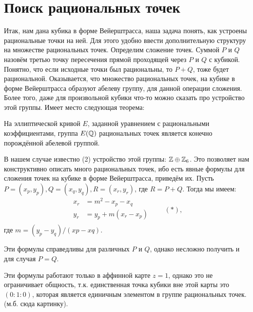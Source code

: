 \section*{Поиск рациональных точек}


Итак, нам дана кубика в форме Вейерштрасса, наша задача понять, как устроены
рациональные точки на ней. Для этого удобно ввести дополнительную структуру на
множестве рациональных точек. Определим сложение точек.  Суммой \(P\) и \(Q\)
назовём третью точку пересечения прямой проходящей через \(P\) и \(Q\) с
кубикой. Понятно, что если исходные точки был рациональны, то \(P + Q\), тоже
будет рациональной.  Оказывается, что множество рациональных точек, на кубике
в форме Вейерштрасса образуют абелеву группу, для данной операции сложения.
Более того, даже для произвольной кубики что-то можно сказать про устройство
этой группы. Имеет место следующая теорема:

\begin{theoremf}
    На эллиптической кривой \(E\), заданной уравнением с рациональными
    коэффициентами, группа \(E(\mathbb{Q})\) рациональных точек является
    конечно порождённой абелевой группой.
\end{theoremf}

В нашем случае известно (2) устройство этой группы:
\(\mathbb{Z} \oplus \mathbb{Z}_6\). Это позволяет нам конструктивно описать много
рациональных точек, ибо есть явные формулы для сложения точек на кубике в форме
Вейерштрасса, приведём их. Пусть \(P = (x_{p}, y_{p}), Q = (x_{q}, y_{q}), R =
(x_{r}, y_{r})\), где \(R = P + Q\). Тогда мы имеем:
\[
\begin{aligned}
    x_r &= m^2 - x_p - x_q \\
    y_r &= y_p + m(x_r - x_p) \\
\end{aligned} \qquad (*)
,\] 
где \(m = (y_{p} - y_{q}) / (x{p} - x{q})\).


\begin{remark}
    Эти формулы справедливы для различных \(P\) и \(Q\), однако несложно получить и
    для случая \(P = Q\).
\end{remark}

\begin{remark}
    Эти формулы работают только в аффинной карте \(z = 1\), однако это не
    ограничивает общность, т.к. единственная точка кубики вне этой карты это
    \((0 : 1 : 0)\), которая является единичным элементом в группе рациональных точек. (м.б.
    сюда картинку).
\end{remark}


